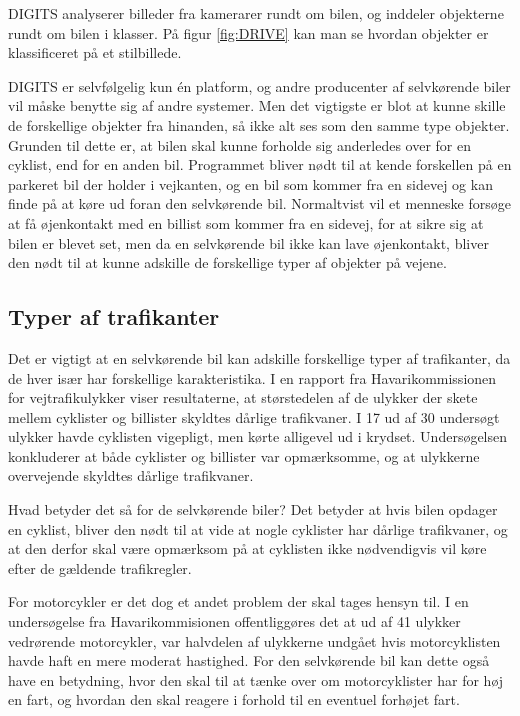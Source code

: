 DIGITS analyserer billeder fra kamerarer rundt om bilen, og inddeler objekterne rundt om bilen i klasser. På figur \ref{fig:DRIVE} kan man se hvordan objekter er klassificeret på et stilbillede.

DIGITS er selvfølgelig kun \'en platform, og andre producenter af selvkørende biler vil måske benytte sig af andre systemer. Men det vigtigste er blot at kunne skille de forskellige objekter fra hinanden\cite{cnet}, så ikke alt ses som den samme type objekter. Grunden til dette er, at bilen skal kunne forholde sig anderledes over for en cyklist, end for en anden bil. Programmet bliver nødt til at kende forskellen på en parkeret bil der holder i vejkanten, og en bil som kommer fra en sidevej og kan finde på at køre ud foran den selvkørende bil. Normaltvist vil et menneske forsøge at få øjenkontakt med en billist som kommer fra en sidevej, for at sikre sig at bilen er blevet set, men da en selvkørende bil ikke kan lave øjenkontakt, bliver den nødt til at kunne adskille de forskellige typer af objekter på vejene.

\subsection{Typer af trafikanter}
Det er vigtigt at en selvkørende bil kan adskille forskellige typer af trafikanter, da de hver især har forskellige karakteristika. I en rapport fra Havarikommissionen for vejtrafikulykker viser resultaterne, at størstedelen af de ulykker der skete mellem cyklister og billister skyldtes dårlige trafikvaner\cite{HVU}. I 17 ud af 30 undersøgt ulykker havde cyklisten vigepligt, men kørte alligevel ud i krydset. Undersøgelsen konkluderer at både cyklister og billister var opmærksomme, og at ulykkerne overvejende skyldtes dårlige trafikvaner. 

Hvad betyder det så for de selvkørende biler? Det betyder at hvis bilen opdager en cyklist, bliver den nødt til at vide at nogle cyklister har dårlige trafikvaner, og at den derfor skal være opmærksom på at cyklisten ikke nødvendigvis vil køre efter de gældende trafikregler. 

For motorcykler er det dog et andet problem der skal tages hensyn til.  I en undersøgelse fra Havarikommisionen offentliggøres det at ud af 41 ulykker vedrørende motorcykler, var halvdelen af ulykkerne undgået hvis motorcyklisten havde haft en mere moderat hastighed\cite{MOT}. For den selvkørende bil kan dette også have en betydning, hvor den skal til at tænke over om motorcyklister har for høj en fart, og hvordan den skal reagere i forhold til en eventuel forhøjet fart.

